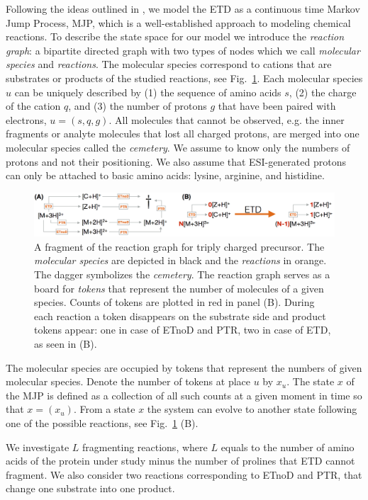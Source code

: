 \documentclass{llncs}
\begin{document}
Following the ideas outlined in \cite{Gambin2010}, we model the ETD as a continuous time Markov Jump Process, MJP, which is a well-established approach to modeling chemical reactions.
To describe the state space for our model we introduce the \textit{reaction graph}: a bipartite directed graph with two types of nodes which we call \textit{molecular species} and \textit{reactions}. The molecular species correspond to cations that are substrates or products of the studied reactions, see Fig.~\ref{img::petrinet}. Each molecular species $u$ can be uniquely described by (1) the sequence of amino acids $s$, (2) the charge of the cation $q$, and (3) the number of protons $g$ that have been paired with electrons, $u = (s,q,g)$. All molecules that cannot be observed, e.g. the inner fragments or analyte molecules that lost all charged protons, are merged into one molecular species called the \textit{cemetery}. We assume to know only the numbers of protons and not their positioning. We also assume that ESI-generated protons can only be attached to basic amino acids: lysine, arginine, and histidine.
\begin{figure}[h]
        \center
        \includegraphics[width=\textwidth]{petrinet.png}
        \caption{A fragment of the reaction graph for triply charged precursor. The \textit{molecular species} are depicted in black and the \textit{reactions} in orange. The dagger symbolizes the \textit{cemetery}. The reaction graph serves as a board for \textit{tokens} that represent the number of molecules of a given species. Counts of tokens are plotted in red in panel (B). During each reaction a token disappears on the substrate side and product tokens appear: one in case of ETnoD and PTR, two in case of ETD, as seen in (B).}\label{img::petrinet}
\end{figure}

The molecular species are occupied by tokens that represent the numbers of given molecular species.
Denote the number of tokens at place $u$ by $x_u$. The state $x$ of the MJP is defined as a collection of all such counts at a given moment in time so that $x = (x_u)$.  From a state $x$ the system can evolve to another state following one of the possible reactions, see Fig.~\ref{img::petrinet} (B).

We investigate $L$ fragmenting reactions, where $L$ equals to the number of amino acids of the protein under study minus the number of prolines that ETD cannot fragment. We also consider two reactions corresponding to ETnoD and PTR, that change one substrate into one product.
\end{document}
